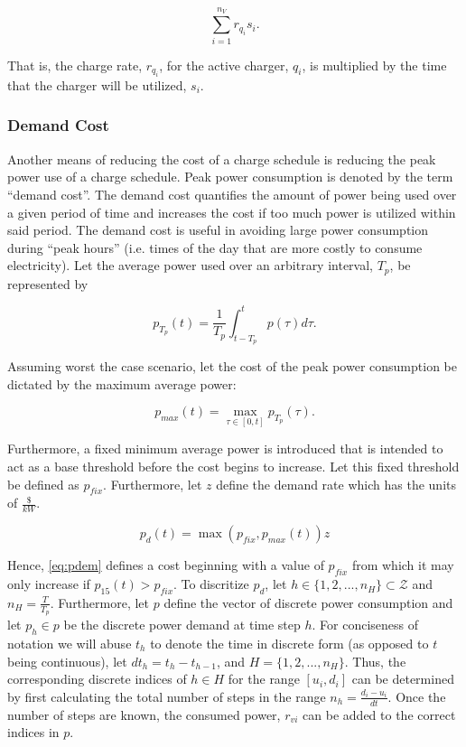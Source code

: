 \documentclass[11pt,a4paper,final]{article}
\newcommand{\Hset}{H}                       %
\begin{document}
\begin{equation}
\label{eq:consumption-cost}
\sum_{i=1}^{n_V} r_{q_i}s_i\text{.}
\end{equation}

That is, the charge rate, \(r_{q_i}\), for the active charger, \(q_i\), is multiplied by the time that the charger will be
utilized, \(s_i\).

\subsubsection{Demand Cost}
\label{sec:demand-cost}
Another means of reducing the cost of a charge schedule is reducing the peak power use of a charge schedule. Peak power
consumption is denoted by the term ``demand cost''. The demand cost quantifies the amount of power being used over a given
period of time and increases the cost if too much power is utilized within said period. The demand cost is useful in
avoiding large power consumption during ``peak hours'' (i.e. times of the day that are more costly to consume
electricity). Let the average power used over an arbitrary interval, \(T_p\), be represented by

\begin{equation}
\label{eq:p}
p_{T_p}(t) = \frac{1}{T_p} \int_{t-T_p}^{t} p(\tau) d\tau\text{.}
\end{equation}

Assuming worst the case scenario, let the cost of the peak power consumption be dictated by the maximum average power:

\begin{equation}
\label{eq:pmax}
p_{max}(t) = \max\limits_{\tau \in [0,t]}p_{T_p}(\tau)\text{.}
\end{equation}

Furthermore, a fixed minimum average power is introduced that is intended to act as a base threshold before the cost
begins to increase. Let this fixed threshold be defined as \(p_{fix}\). Furthermore, let \(z\) define the demand rate which
has the units of \(\frac{\$}{kW}\).

\begin{equation}
\label{eq:pdem}
p_d(t) = \max(p_{fix},p_{max}(t))z
\end{equation}

Hence, \ref{eq:pdem} defines a cost beginning with a value of \(p_{fix}\) from which it may only increase if \(p_{15}(t) >
p_{fix}\). To discritize \(p_d\), let \(h \in \{ 1, 2, ..., n_H \} \subset \mathcal{Z}\) and \(n_H = \frac{T}{T_p}\). Furthermore, let \(p\) define
the vector of discrete power consumption and let \(p_h \in p\) be the discrete power demand at time step \(h\). For
conciseness of notation we will abuse \(t_h\) to denote the time in discrete form (as opposed to \(t\) being continuous),
let \(dt_h = t_h - t_{h-1}\), and \(\Hset = \{ 1, 2, ..., n_H \}\). Thus, the corresponding discrete indices of \(h \in \Hset\)
for the range \([u_i, d_i]\) can be determined by first calculating the total number of steps in the range \(n_h =
\frac{d_i - u_i}{dt}\). Once the number of steps are known, the consumed power, \(r_{vi}\) can be added to the correct
indices in \(p\).
\end{document}
